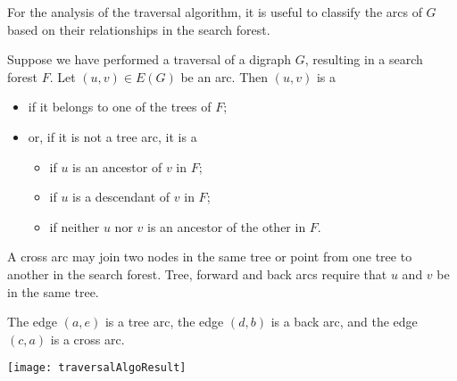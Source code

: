 For the analysis of the traversal algorithm, it is useful to classify the arcs of $G$ based on their relationships in the search forest.  

\begin{Definition}\label{defn:arc-types}
Suppose we have performed a traversal of a digraph $G$, resulting in a
search forest $F$.  Let $(u, v)\in E(G)$ be an arc. Then $(u, v)$ is a
\begin{itemize} 
\item {} if it belongs to one of the trees of $F$;
\item or, if it is not a tree arc, it is a
\begin{itemize}
\item {} if $u$ is an ancestor of $v$ in $F$;
\item {} if $u$ is a descendant of $v$ in $F$; 
\item {} if neither $u$ nor $v$ is an ancestor of the other in $F$.
\end{itemize}
\end{itemize}
\end{Definition} 

A cross arc may join two nodes in the same tree or point from one tree to another in the search forest. 
Tree, forward and back arcs require that $u$ and $v$ be in the same tree.

\begin{Boxample}
The edge $(a, e)$ is a tree arc, the edge $(d, b)$ is a back arc, and the edge $(c, a)$ is a cross arc.
\begin{center}
\texttt{[image: traversalAlgoResult]} 
\end{center}
\end{Boxample}




